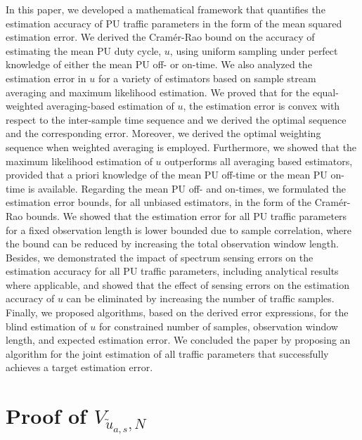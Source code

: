 \documentclass[11pt,draftclsnofoot,journal,onecolumn]{IEEEtran}
\begin{document}
In this paper, we developed a mathematical framework that quantifies the estimation accuracy of PU traffic parameters in the form of the mean squared estimation error. We derived the Cram\'{e}r-Rao bound on the accuracy of estimating the mean PU duty cycle, $u$, using uniform sampling under perfect knowledge of either the mean PU off- or on-time. We also analyzed the estimation error in $u$ for a variety of estimators based on sample stream averaging and maximum likelihood estimation. We proved that for the equal-weighted averaging-based estimation of $u$, the estimation error is convex with respect to the inter-sample time sequence and we derived the optimal sequence and the corresponding error. Moreover, we derived the optimal weighting sequence when weighted averaging is employed. Furthermore, we showed that the maximum likelihood estimation of $u$ outperforms all averaging based estimators, provided that a priori knowledge of the mean PU off-time or the mean PU on-time is available. Regarding the mean PU off- and on-times, we formulated the estimation error bounds, for all unbiased estimators, in the form of the Cram\'{e}r-Rao bounds. We showed that the estimation error for all PU traffic parameters for a fixed observation length is lower bounded due to sample correlation, where the bound can be reduced by increasing the total observation window length. Besides, we demonstrated the impact of spectrum sensing errors on the estimation accuracy for all PU traffic parameters, including analytical results where applicable, and showed that the effect of sensing errors on the estimation accuracy of $u$ can be eliminated by increasing the number of traffic samples. Finally, we proposed algorithms, based on the derived error expressions, for the blind estimation of $u$ for constrained number of samples, observation window length, and expected estimation error. We concluded the paper by proposing an algorithm for the joint estimation of all traffic parameters that successfully achieves a target estimation error.

\appendices

\renewcommand{\theequation}{\thesection.\arabic{equation}}

\section{Proof of $V_{\tilde{u}_{a,s},N}$}
\label{sec:math_ind_vu}
\end{document}
